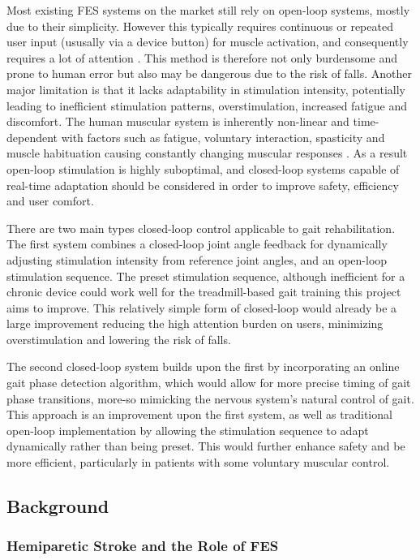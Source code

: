 Most existing FES systems on the market still rely on open-loop systems, mostly due to their simplicity\cite{braz_functional_2009}. However this typically requires continuous or repeated user input (ususally via a device button) for muscle activation, and consequently requires a lot of attention \cite{hayami_development_2022}. This method is therefore not only burdensome and prone to human error but also may be dangerous due to the risk of falls. Another major limitation is that it lacks adaptability in stimulation intensity, potentially leading to inefficient stimulation patterns, overstimulation, increased fatigue and discomfort. The human muscular system is inherently non-linear and time-dependent with factors such as fatigue, voluntary interaction, spasticity and muscle habituation causing constantly changing muscular responses  \cite{chaikho_transcutaneous_2022}. As a result open-loop stimulation is highly suboptimal, and closed-loop systems capable of real-time adaptation should be considered in order to improve safety, efficiency and user comfort.

There are two main types closed-loop control applicable to gait rehabilitation. The first system combines a closed-loop joint angle feedback for dynamically adjusting stimulation intensity from reference joint angles, and an open-loop stimulation sequence. The preset stimulation sequence, although inefficient for a chronic device could work well for the treadmill-based gait training this project aims to improve. This relatively simple form of closed-loop would already be a large improvement reducing the high attention burden on users, minimizing overstimulation and lowering the risk of falls.  

The second closed-loop system builds upon the first by incorporating an online gait phase detection algorithm, which would allow for more precise timing of gait phase transitions, more-so mimicking the nervous system's natural control of gait. This approach is an improvement upon the first system, as well as traditional open-loop implementation by allowing the stimulation sequence to adapt dynamically rather than being preset. This would further enhance safety and be more efficient, particularly in patients with some voluntary muscular control.


\subsection{Background}
\subsubsection*{Hemiparetic Stroke and the Role of FES}

